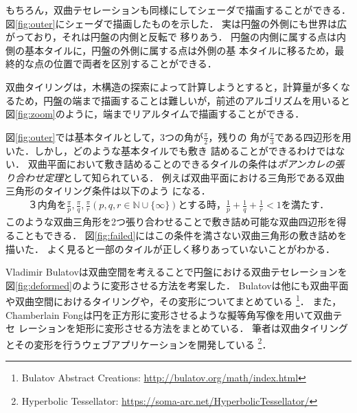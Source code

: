 もちろん，双曲テセレーションも同様にしてシェーダで描画することができる．
図\ref{fig:outer}にシェーダで描画したものを示した．
実は円盤の外側にも世界は広がっており，それは円盤の内側と反転で
移りあう．
円盤の内側に属する点は内側の基本タイルに，円盤の外側に属する点は外側の基
本タイルに移るため，最終的な点の位置で両者を区別することができる．

双曲タイリングは，木構造の探索によって計算しようとすると，計算量が多くな
るため，円盤の端まで描画することは難しいが，前述のアルゴリズムを用いると
図\ref{fig:zoom}のように，端までリアルタイムで描画することができる．

図\ref{fig:outer}では基本タイルとして，3つの角が$\frac{\pi}{2}$，残りの
角が$\frac{\pi}{3}$である四辺形を用いた．しかし，どのような基本タイルでも敷き
詰めることができるわけではない．
双曲平面において敷き詰めることのできるタイルの条件は\emph{ポアンカレの張
り合わせ定理}として知られている．
例えば双曲平面における三角形である双曲三角形のタイリング条件は以下のよう
になる．
\begin{eqnarray*}
\text{３内角を}\frac{\pi}{p},\frac{\pi}{q},\frac{\pi}{r} (p, q, r \in
 \mathbb{N} \cup \{\infty\}) \text{とする時，}
 \frac{1}{p} + \frac{1}{q} + \frac{1}{r} < 1 \text{を満たす．}
\end{eqnarray*}
このような双曲三角形を2つ張り合わせることで敷き詰め可能な双曲四辺形を得
ることもできる．
図\ref{fig:failed}にはこの条件を満さない双曲三角形の敷き詰めを描いた．
よく見ると一部のタイルが正しく移りあっていないことがわかる．

Vladimir Bulatovは双曲空間を考えることで円盤における双曲テセレーションを
図\ref{fig:deformed}のように変形させる方法を考案した\cite{bridges2013-167}\cite{bridges2011-479}．
Bulatovは他にも双曲平面や双曲空間におけるタイリングや，その変形についてまとめている
\footnote{Bulatov Abstract Creations:
\url{http://bulatov.org/math/index.html}}．
また，Chamberlain Fongは円を正方形に変形させるような擬等角写像を用いて双曲テセ
レーションを矩形に変形させる方法をまとめている\cite{bridges2016-179}．
筆者は双曲タイリングとその変形を行うウェブアプリケーションを開発している
\footnote{Hyperbolic Tessellator: \url{https://soma-arc.net/HyperbolicTessellator/}}．

